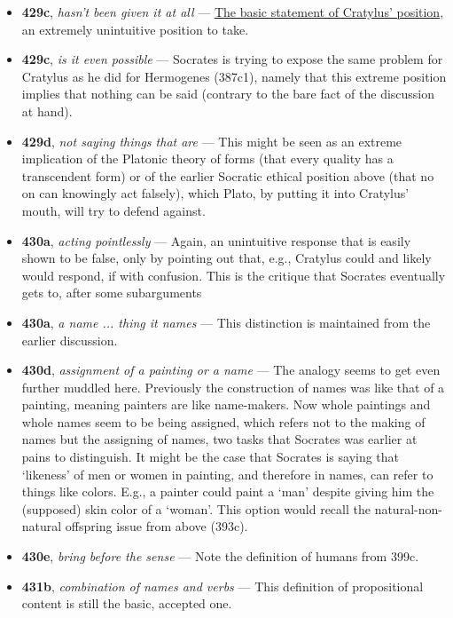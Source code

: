 \documentclass[12pt]{article}
\begin{document}
\begin{itemize}
\item \textbf{429c}, \textit{hasn't been given it at all} --- \ul{The basic statement of Cratylus' position}, an extremely unintuitive position to take.

\item \textbf{429c}, \textit{is it even possible} --- Socrates is trying to expose the same problem for Cratylus as he did for Hermogenes (387c1), namely that this extreme position implies that nothing can be said (contrary to the bare fact of the discussion at hand).

\item \textbf{429d}, \textit{not saying things that are} --- This might be seen as an extreme implication of the Platonic theory of forms (that every quality has a transcendent form) or of the earlier Socratic ethical position above (that no on can knowingly act falsely), which Plato, by putting it into Cratylus' mouth, will try to defend against.

\item \textbf{430a}, \textit{acting pointlessly} --- Again, an unintuitive response that is easily shown to be false, only by pointing out that, e.g., Cratylus could and likely would respond, if with confusion. This is the critique that Socrates eventually gets to, after some subarguments

\item \textbf{430a}, \textit{a name ... thing it names} --- This distinction is maintained from the earlier discussion.

\item \textbf{430d}, \textit{assignment of a painting or a name} --- The analogy seems to get even further muddled here. Previously the construction of names was like that of a painting, meaning painters are like name-makers. Now whole paintings and whole names seem to be being assigned, which refers not to the making of names but the assigning of names, two tasks that Socrates was earlier at pains to distinguish. It might be the case that Socrates is saying that `likeness' of men or women in painting, and therefore in names, can refer to things like colors. E.g., a painter could paint a `man' despite giving him the (supposed) skin color of a `woman'. This option would recall the natural-non-natural offspring issue from above (393c).

\item \textbf{430e}, \textit{bring before the sense} --- Note the definition of humans from 399c. 

\item \textbf{431b}, \textit{combination of names and verbs} --- This definition of propositional content is still the basic, accepted one.


\end{itemize}
\end{document}
